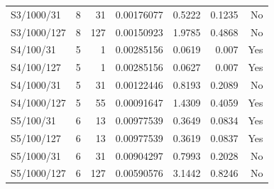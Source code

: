 \begin{longtable}{lrrrrrr}
S3/1000/31 & 8 & 31 & 0.00176077 & 0.5222 & 0.1235 & No \\
S3/1000/127 & 8 & 127 & 0.00150923 & 1.9785 & 0.4868 & No \\
S4/100/31 & 5 & 1 & 0.00285156 & 0.0619 & 0.007 & Yes \\
S4/100/127 & 5 & 1 & 0.00285156 & 0.0627 & 0.007 & Yes \\
S4/1000/31 & 5 & 31 & 0.00122446 & 0.8193 & 0.2089 & No \\
S4/1000/127 & 5 & 55 & 0.00091647 & 1.4309 & 0.4059 & Yes \\
S5/100/31 & 6 & 13 & 0.00977539 & 0.3649 & 0.0834 & Yes \\
S5/100/127 & 6 & 13 & 0.00977539 & 0.3619 & 0.0837 & Yes \\
S5/1000/31 & 6 & 31 & 0.00904297 & 0.7993 & 0.2028 & No \\
S5/1000/127 & 6 & 127 & 0.00590576 & 3.1442 & 0.8246 & No \\
\bottomrule
\end{longtable}
